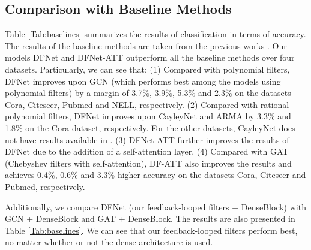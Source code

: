 \documentclass{article}
\begin{document}
\subsection{Comparison with Baseline Methods}
Table \ref{Tab:baselines} summarizes the results of classification in terms of accuracy. The results of the baseline methods are taken from the previous works  \cite{kipf2016semi, liao2019lanczosnet, velivckovic2017graph, yang2016revisiting}. Our models DFNet and DFNet-ATT outperform all the baseline methods over four datasets. Particularly, we can see that: (1) Compared with polynomial filters, DFNet improves upon GCN (which performs best among the models using polynomial filters) by a margin of 3.7\%, 3.9\%, 5.3\% and 2.3\% on the datasets Cora, Citeseer, Pubmed and NELL, respectively. (2) Compared with rational polynomial filters, DFNet improves upon CayleyNet and ARMA by 3.3\% and 1.8\% on the Cora dataset, respectively. For the other datasets, CayleyNet does not have results available in \cite{levie2017cayleynets}. (3) DFNet-ATT further improves the results of DFNet due to the addition of a self-attention layer. (4) Compared with GAT (Chebyshev filters with self-attention), DF-ATT also improves the results and achieves 0.4\%, 0.6\% and 3.3\% higher accuracy on the datasets Cora, Citeseer and Pubmed, respectively.

Additionally, we compare DFNet (our feedback-looped filters + DenseBlock) with GCN + DenseBlock and GAT + DenseBlock. The results are also presented in Table \ref{Tab:baselines}. We can see that our feedback-looped filters perform best, no matter whether or not the dense architecture is used. 
\end{document}
